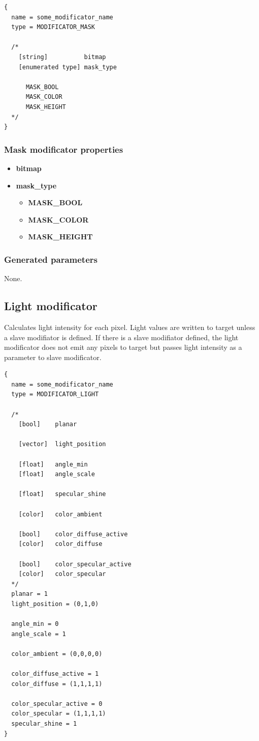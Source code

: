\documentclass[9pt]{article}
\begin{document}
\begin{verbatim}
{
  name = some_modificator_name
  type = MODIFICATOR_MASK

  /*
    [string]          bitmap
    [enumerated type] mask_type
  
      MASK_BOOL
      MASK_COLOR
      MASK_HEIGHT
  */
}
\end{verbatim}
\subsubsection*{Mask modificator properties}
\begin{itemize}
\item{\bf bitmap}
\item{\bf mask\_type}
\begin{itemize}
\item{\bf MASK\_BOOL}
\item{\bf MASK\_COLOR}
\item{\bf MASK\_HEIGHT}
\end{itemize}
\end{itemize}

\subsubsection*{Generated parameters}

None.

\subsection{Light modificator}

Calculates light intensity for each pixel. Light values are written to target 
unless a slave modifiator is defined. If there is a slave modifiator defined, the
light modificator does not emit any pixels to target but passes light intensity as 
a parameter to slave modificator.

\begin{verbatim}
{
  name = some_modificator_name
  type = MODIFICATOR_LIGHT

  /*      
    [bool]    planar
      
    [vector]  light_position
      
    [float]   angle_min
    [float]   angle_scale
      
    [float]   specular_shine
      
    [color]   color_ambient
      
    [bool]    color_diffuse_active
    [color]   color_diffuse
      
    [bool]    color_specular_active
    [color]   color_specular
  */
  planar = 1
  light_position = (0,1,0)
  
  angle_min = 0
  angle_scale = 1
  
  color_ambient = (0,0,0,0)
  
  color_diffuse_active = 1
  color_diffuse = (1,1,1,1)
  
  color_specular_active = 0
  color_specular = (1,1,1,1)
  specular_shine = 1
}
\end{verbatim}
\end{document}

